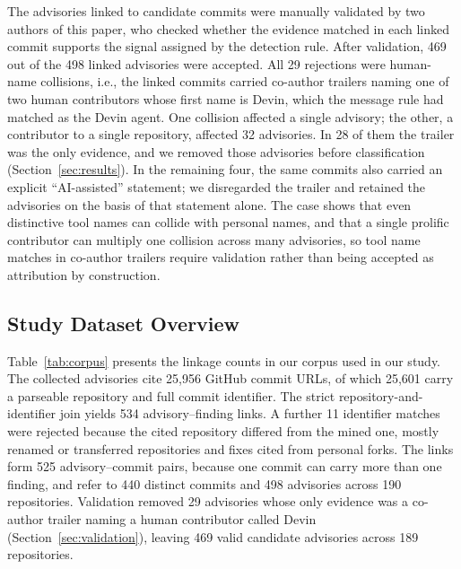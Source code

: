 \documentclass[smallextended,natbib]{svjour3}
\begin{document}
The advisories linked to candidate commits were manually validated by two authors
of this paper, who checked whether the evidence matched in each linked commit
supports the signal assigned by the detection rule. 
After validation, 469 out of the 498 linked advisories  were accepted.
All 29 rejections were human-name collisions, i.e.,  the linked commits carried
co-author trailers naming one of two human contributors whose first name is
Devin, which the message rule had matched as the Devin agent.  One collision
affected a single advisory; the other, a contributor to a single repository, affected
32 advisories.  In 28 of them the trailer was the only evidence, and we removed
those advisories before classification (Section~\ref{sec:results}).  In the
remaining four, the same commits also carried an explicit ``AI-assisted''
statement; we disregarded the trailer and retained the advisories on the basis
of that statement alone.  The case shows that even distinctive tool names can
collide with personal names, and that a single prolific contributor can
multiply one collision across many advisories, so tool name  matches in
co-author trailers require validation rather than being accepted as
attribution by construction.
\subsection{Study Dataset Overview}

Table~\ref{tab:corpus} presents the linkage counts in  our corpus used in our study. The collected advisories cite 25{,}956
GitHub commit URLs, of which 25{,}601 carry a parseable repository and full
commit identifier.  The strict repository-and-identifier join yields 534
advisory--finding links.  A further 11 identifier matches were rejected
because the cited repository differed from the mined one, mostly renamed or
transferred repositories and fixes cited from personal forks.  The links form 525 advisory--commit pairs, because
one commit can carry more than one finding, and refer to 440 distinct commits
and 498 advisories across 190 repositories.  Validation removed 29 advisories
whose only evidence was a co-author trailer naming a human contributor called
Devin (Section~\ref{sec:validation}), leaving 469 valid candidate advisories
across 189 repositories.
\end{document}
